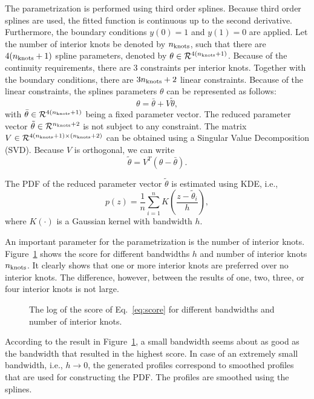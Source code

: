 \documentclass[10pt,final,a4paper,oneside,onecolumn]{article}
\newlength\figurewidth
\newlength\figureheight
\theoremstyle{plain}\newtheorem{definition}{Definition}[section]    %
\theoremstyle{definition}\newtheorem{example}{Example}[section]     %
\theoremstyle{remark}\newtheorem{remarkenv}{Remark}[section]        %
\newcommand{\nknots}{n_{\textup{knots}}}
\begin{document}
The parametrization is performed using third order splines. Because third order splines are used, the fitted function is continuous up to the second derivative. Furthermore, the boundary conditions $y(0)=1$ and $y(1)=0$ are applied. Let the number of interior knots be denoted by $\nknots$, such that there are $4(\nknots+1)$ spline parameters, denoted by $\theta \in \mathcal{R}^{4(\nknots+1)}$. Because of the continuity requirements, there are $3$ constraints per interior knots. Together with the boundary conditions, there are $3\nknots+2$ linear constraints. Because of the linear constraints, the splines parameters $\theta$ can be represented as follows:
\begin{equation}
	\theta = \bar{\theta} + V \tilde{\theta},
\end{equation}
with $\bar{\theta} \in \mathcal{R}^{4(\nknots+1)}$ being a fixed parameter vector. The reduced parameter vector $\tilde{\theta} \in \mathcal{R}^{\nknots+2}$ is not subject to any constraint. The matrix $V \in \mathcal{R}^{4(\nknots+1) \times (\nknots+2)}$ can be obtained using a Singular Value Decomposition (SVD). Because $V$ is orthogonal, we can write
\begin{equation}
	\tilde{\theta} = V^T \left( \theta - \bar{\theta} \right).
\end{equation}

The PDF of the reduced parameter vector $\tilde{\theta}$ is estimated using KDE, i.e.,
\begin{equation}
	p(z) = \frac{1}{n} \sum_{i=1}^{n} K \left( \frac{ z - \tilde{\theta}_i }{h} \right),
\end{equation}
where $K(\cdot)$ is a Gaussian kernel with bandwidth $h$.

An important parameter for the parametrization is the number of interior knots. Figure~\ref{fig:number of knots} shows the score for different bandwidths $h$ and number of interior knots $\nknots$. It clearly shows that one or more interior knots are preferred over no interior knots. The difference, however, between the results of one, two, three, or four interior knots is not large. 

\begin{figure}
	\centering
	\setlength\figureheight{200pt}
	\setlength\figurewidth{300pt}
	
	\caption{The log of the score of Eq.~\eqref{eq:score} for different bandwidths and number of interior knots.}
	\label{fig:number of knots}
\end{figure}

According to the result in Figure~\ref{fig:number of knots}, a small bandwidth seems about as good as the bandwidth that resulted in the highest score. In case of an extremely small bandwidth, i.e., $h \rightarrow 0$, the generated profiles correspond to smoothed profiles that are used for constructing the PDF. The profiles are smoothed using the splines. 



\end{document}
